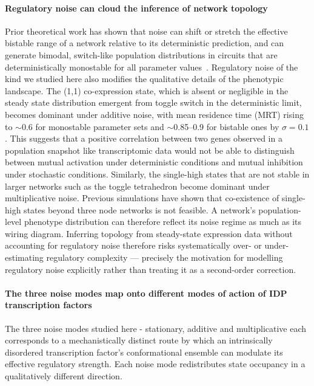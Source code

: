 \documentclass[11pt]{article}
\begin{document}
\paragraph{Regulatory noise can cloud the inference of network topology}
Prior theoretical work has shown that noise can shift or stretch the effective bistable range of a network relative to its deterministic prediction, and can generate bimodal, switch-like population distributions in circuits that are deterministically monostable for all parameter values~\cite{OchabMarcinek2010w}. Regulatory noise of the kind we studied here also modifies the qualitative details of the phenotypic landscape. The (1,1) co-expression state, which is absent or negligible in the steady state distribution emergent from toggle switch in the deterministic limit, becomes dominant under additive noise, with mean residence time (MRT) rising to $\sim$0.6 for monostable parameter sets and $\sim$0.85--0.9 for bistable ones by $\sigma = 0.1$. This suggests that a positive correlation between two genes observed in a population snapshot like transcriptomic data would not be able to distinguish between mutual activation under deterministic conditions and mutual inhibition under stochastic conditions. Similarly, the single-high states that are not stable in larger networks such as the toggle tetrahedron become dominant under multiplicative noise. Previous simulations have shown that co-existence of single-high states beyond three node networks is not feasible. A network's population-level phenotype distribution can therefore reflect its noise regime as much as its wiring diagram. Inferring topology from steady-state expression data without accounting for regulatory noise therefore risks systematically over- or under-estimating regulatory complexity --- precisely the motivation for modelling regulatory noise explicitly rather than treating it as a second-order correction.

\paragraph{The three noise modes map onto different modes of action of IDP transcription factors}
The three noise modes studied here - stationary, additive and multiplicative each corresponds to a mechanistically distinct route by which an intrinsically disordered transcription factor's conformational ensemble can modulate its effective regulatory strength. Each noise mode redistributes state occupancy in a qualitatively different direction.
\end{document}
